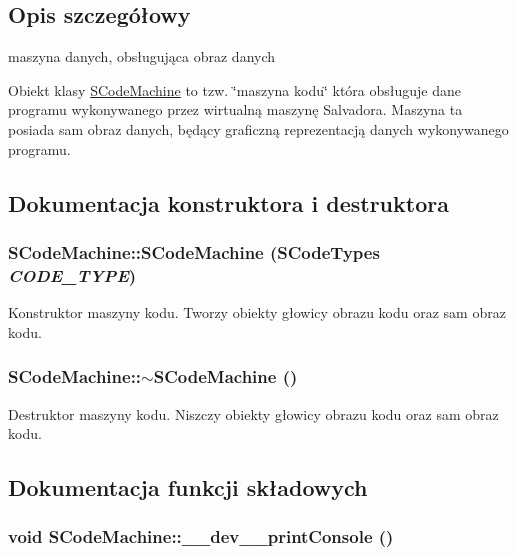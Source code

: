 \subsection{Opis szczegółowy}
maszyna danych, obsługująca obraz danych 

Obiekt klasy \hyperlink{classSCodeMachine}{SCodeMachine} to tzw. \char`\"{}maszyna kodu\char`\"{} która obsługuje dane programu wykonywanego przez wirtualną maszynę Salvadora. Maszyna ta posiada sam obraz danych, będący graficzną reprezentacją danych wykonywanego programu. 

\subsection{Dokumentacja konstruktora i destruktora}
\hypertarget{classSCodeMachine_bb85f472be7c8e2112bbe5d6643f99b7}{
\subsubsection[{SCodeMachine}]{\setlength{\rightskip}{0pt plus 5cm}SCodeMachine::SCodeMachine ({\bf SCodeTypes} {\em CODE\_\-TYPE})}}
\label{classSCodeMachine_bb85f472be7c8e2112bbe5d6643f99b7}


Konstruktor maszyny kodu. Tworzy obiekty głowicy obrazu kodu oraz sam obraz kodu. \hypertarget{classSCodeMachine_67d39a3662fc2640aa506a581766a9b8}{
\subsubsection[{$\sim$SCodeMachine}]{\setlength{\rightskip}{0pt plus 5cm}SCodeMachine::$\sim$SCodeMachine ()}}
\label{classSCodeMachine_67d39a3662fc2640aa506a581766a9b8}


Destruktor maszyny kodu. Niszczy obiekty głowicy obrazu kodu oraz sam obraz kodu. 

\subsection{Dokumentacja funkcji składowych}
\hypertarget{classSCodeMachine_29892f8f026e8dcd71ec99b9c593e022}{
\subsubsection[{\_\-\_\-dev\_\-\_\-printConsole}]{\setlength{\rightskip}{0pt plus 5cm}void SCodeMachine::\_\-\_\-dev\_\-\_\-printConsole ()}}
\label{classSCodeMachine_29892f8f026e8dcd71ec99b9c593e022}


